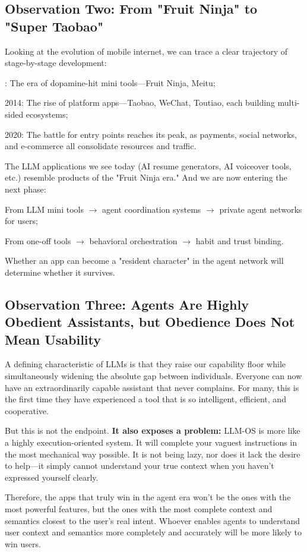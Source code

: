 \subsection{Observation Two: From "Fruit Ninja" to "Super Taobao"}

Looking at the evolution of mobile internet, we can trace a clear trajectory of stage-by-stage development:

{: The era of dopamine-hit mini tools---Fruit Ninja, Meitu;

2014: The rise of platform apps---Taobao, WeChat, Toutiao, each building multi-sided ecosystems;

2020: The battle for entry points reaches its peak, as payments, social networks, and e-commerce all consolidate resources and traffic.
}

The LLM applications we see today (AI resume generators, AI voiceover tools, etc.) resemble products of the "Fruit Ninja era." And we are now entering the next phase:

{\kaiti
From LLM mini tools $\to$ agent coordination systems $\to$ private agent networks for users;

From one-off tools $\to$ behavioral orchestration $\to$ habit and trust binding.
}

Whether an app can become a "resident character" in the agent network will determine whether it survives.


\subsection{Observation Three: Agents Are Highly Obedient Assistants, but Obedience Does Not Mean Usability}

A defining characteristic of LLMs is that they raise our capability floor while simultaneously widening the absolute gap between individuals. Everyone can now have an extraordinarily capable assistant that never complains. For many, this is the first time they have experienced a tool that is so intelligent, efficient, and cooperative.

But this is not the endpoint. \textbf{It also exposes a problem:}
LLM-OS is more like a highly execution-oriented system. It will complete your vaguest instructions in the most mechanical way possible.
It is not being lazy, nor does it lack the desire to help---it simply cannot understand your true context when you haven't expressed yourself clearly.

Therefore, the apps that truly win in the agent era won't be the ones with the most powerful features, but the ones with the most complete context and semantics closest to the user's real intent.
Whoever enables agents to understand user context and semantics more completely and accurately will be more likely to win users.

